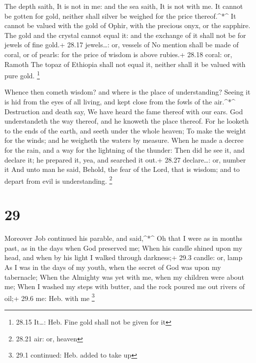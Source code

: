  The depth saith, It is not in me: and the sea saith, It is
not with me.  It cannot be gotten for gold, neither shall
silver be weighed for the price thereof.\^{}*\^{}  It
cannot be valued with the gold of Ophir, with the precious onyx, or the
sapphire.  The gold and the crystal cannot equal it: and
the exchange of it shall not be for jewels of fine gold.+ 28.17
jewels\ldots: or, vessels of  No mention shall be made of
coral, or of pearls: for the price of wisdom is above rubies.+ 28.18
coral: or, Ramoth  The topaz of Ethiopia shall not equal
it, neither shall it be valued with pure gold. \footnote{28.15 It\ldots:
  Heb. Fine gold shall not be given for it}

 Whence then cometh wisdom? and where is the place of
understanding?  Seeing it is hid from the eyes of all
living, and kept close from the fowls of the air.\^{}*\^{} 
Destruction and death say, We have heard the fame thereof with our ears.
 God understandeth the way thereof, and he knoweth the
place thereof.  For he looketh to the ends of the earth,
and seeth under the whole heaven;  To make the weight for
the winds; and he weigheth the waters by measure.  When he
made a decree for the rain, and a way for the lightning of the thunder:
 Then did he see it, and declare it; he prepared it, yea,
and searched it out.+ 28.27 declare\ldots: or, number it 
And unto man he said, Behold, the fear of the Lord, that is wisdom; and
to depart from evil is understanding. \footnote{28.21 air: or, heaven}

\hypertarget{section-28}{%
\section{29}\label{section-28}}

 Moreover Job continued his parable, and said,\^{}*\^{}
 Oh that I were as in months past, as in the days when God
preserved me;  When his candle shined upon my head, and when
by his light I walked through darkness;+ 29.3 candle: or, lamp
 As I was in the days of my youth, when the secret of God
was upon my tabernacle;  When the Almighty was yet with me,
when my children were about me;  When I washed my steps with
butter, and the rock poured me out rivers of oil;+ 29.6 me: Heb. with me
\footnote{29.1 continued: Heb. added to take up}

